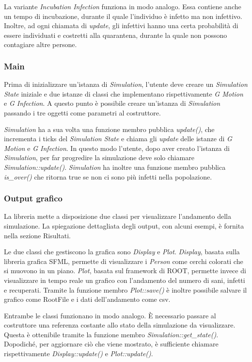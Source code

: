 \documentclass[a4paper,10pt,twocolumn]{article}
\begin{document}
La variante \emph{Incubation Infection} funziona in modo analogo. Essa contiene anche un tempo di incubazione, durante il quale l'individuo è infetto ma non infettivo. Inoltre, ad ogni chiamata di \emph{update}, gli infettivi hanno una certa probabilità di essere individuati e costretti alla quarantena, durante la quale non possono contagiare altre persone.

\subsubsection*{Main}
Prima di inizializzare un’istanza di \emph{Simulation}, l’utente deve creare un \emph{Simulation State} iniziale e due istanze di classi che implementano rispettivamente \emph{G Motion} e \emph{G Infection}. A questo punto è possibile creare un’istanza di \emph{Simulation} passando i tre oggetti come parametri al costruttore.

\emph{Simulation} ha a sua volta una funzione membro pubblica \emph{update()}, che incrementa i ticks del \emph{Simulation State} e chiama gli \emph{update} delle istanze di \emph{G Motion} e \emph{G Infection}. In questo modo l’utente, dopo aver creato l’istanza di \emph{Simulation}, per far progredire la simulazione deve solo chiamare \emph{Simulation::update()}.
\emph{Simulation} ha inoltre una funzione membro pubblica \emph{is\_over()} che ritorna true se non ci sono più infetti nella popolazione.

\subsubsection*{Output grafico}
La libreria mette a disposizione due classi per visualizzare l’andamento della simulazione. La spiegazione dettagliata degli output, con alcuni esempi, è fornita nella sezione Risultati.

Le due classi che gestiscono la grafica sono \emph{Display} e \emph{Plot}. \emph{Display}, basata sulla libreria grafica SFML, permette di visualizzare i \emph{Person} come cerchi colorati che si muovono in un piano. \emph{Plot}, basata sul framework di ROOT, permette invece di visualizzare in tempo reale un grafico con l’andamento del numero di sani, infetti e recuperati. Tramite la funzione membro \emph{Plot::save()} è inoltre possibile salvare il grafico come RootFile e i dati dell’andamento come csv.

Entrambe le classi funzionano in modo analogo. È necessario passare al costruttore una referenza costante allo stato della simulazione da visualizzare. Questa è ottenibile tramite la funzione membro \emph{Simulation::get\_state()}. Dopodiché, per aggiornare ciò che viene mostrato, è sufficiente chiamare rispettivamente \emph{Display::update()} e \emph{Plot::update()}.
\end{document}
